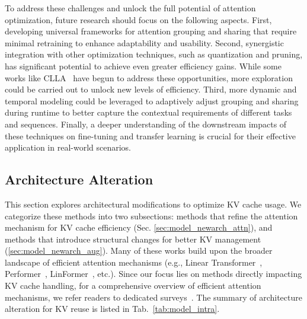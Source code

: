 To address these challenges and unlock the full potential of attention optimization, future research should focus on the following aspects. First, developing universal frameworks for attention grouping and sharing that require minimal retraining to enhance adaptability and usability. Second, synergistic integration with other optimization techniques, such as quantization and pruning, has significant potential to achieve even greater efficiency gains. While some works like CLLA~\cite{yangLosslessKVCache2024} have begun to address these opportunities, more exploration could be carried out to unlock new levels of efficiency. Third, more dynamic and temporal modeling could be leveraged to adaptively adjust grouping and sharing during runtime to better capture the contextual requirements of different tasks and sequences. Finally, a deeper understanding of the downstream impacts of these techniques on fine-tuning and transfer learning is crucial for their effective application in real-world scenarios.


 


\subsection{Architecture Alteration}\label{sec:model_newarch}

This section explores architectural modifications to optimize KV cache usage. We categorize these methods into two subsections: methods that refine the attention mechanism for KV cache efficiency (Sec. \ref{sec:model_newarch_attn}), and methods that introduce structural changes for better KV management (\ref{sec:model_newarch_aug}). Many of these works build upon the broader landscape of efficient attention mechanisms (e.g., Linear Transformer~\cite{katharopoulos2020transformers}, Performer~\cite{choromanski2020rethinking}, LinFormer~\cite{wang2020linformer}, etc.). Since our focus lies on methods directly impacting KV cache handling, for a comprehensive overview of efficient attention mechanisms, we refer readers to dedicated surveys~\cite{zhou2024survey}.
The summary of architecture alteration for KV reuse is listed in Tab.~\ref{tab:model_intra}.


